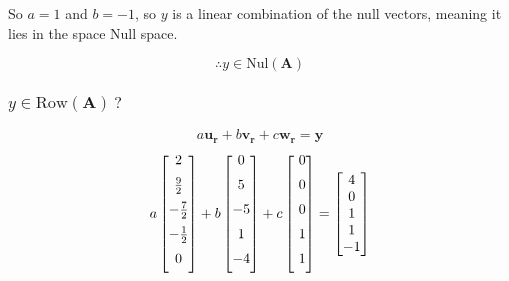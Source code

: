 \documentclass{article}
\begin{document}
So $a = 1$ and $b = -1$, so  $y$ is a linear combination of the null vectors,
meaning it lies in the space Null space.

\[%
    \therefore y \in \text{Nul}(\mathbf{A})
\]%

\subsubsection{$ y \in \text{Row}(\mathbf{A}) \ ?$}

\[%
    a \mathbf{u_r} + b \mathbf{v_r} + c \mathbf{w_r}  = \mathbf{y}
\]%
\[%
    a
     \begin{bmatrix} 
        \vspace{2mm}
        2 \\ \vspace{2mm}
        \frac{9}{2}  \\ \vspace{2mm}
        -\frac{7}{2}  \\ \vspace{2mm}
        -\frac{1}{2}  \\ \vspace{2mm}
        0 \\ 
    \end{bmatrix}
    +
    b
    \begin{bmatrix} \vspace{2mm}
        0  \\ \vspace{2mm}
        5  \\ \vspace{2mm}
        -5 \\ \vspace{2mm}
        1  \\ \vspace{2mm}
        -4 \\ 
    \end{bmatrix}
    +
    c
    \begin{bmatrix} \vspace{2mm}
        \ 0 \\ \vspace{2mm} 
        \ 0 \\ \vspace{2mm} 
        \ 0 \\ \vspace{2mm} 
        \ 1 \\ \vspace{2mm} 
        \ 1 \\		
    \end{bmatrix}
    =
    \begin{bmatrix} 4\\0\\1\\1\\-1 \end{bmatrix}
\]%
\end{document}
